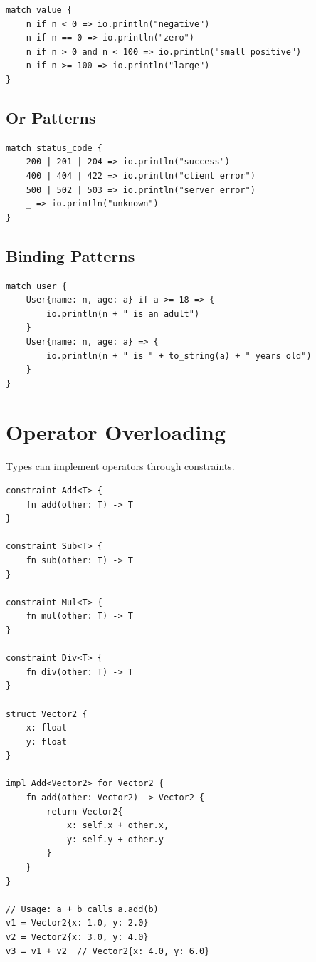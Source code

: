 \begin{lstlisting}
match value {
    n if n < 0 => io.println("negative")
    n if n == 0 => io.println("zero")
    n if n > 0 and n < 100 => io.println("small positive")
    n if n >= 100 => io.println("large")
}
\end{lstlisting}

\subsection{Or Patterns}

\begin{lstlisting}
match status_code {
    200 | 201 | 204 => io.println("success")
    400 | 404 | 422 => io.println("client error")
    500 | 502 | 503 => io.println("server error")
    _ => io.println("unknown")
}
\end{lstlisting}

\subsection{Binding Patterns}

\begin{lstlisting}
match user {
    User{name: n, age: a} if a >= 18 => {
        io.println(n + " is an adult")
    }
    User{name: n, age: a} => {
        io.println(n + " is " + to_string(a) + " years old")
    }
}
\end{lstlisting}

\section{Operator Overloading}

Types can implement operators through constraints.

\begin{lstlisting}
constraint Add<T> {
    fn add(other: T) -> T
}

constraint Sub<T> {
    fn sub(other: T) -> T
}

constraint Mul<T> {
    fn mul(other: T) -> T
}

constraint Div<T> {
    fn div(other: T) -> T
}

struct Vector2 {
    x: float
    y: float
}

impl Add<Vector2> for Vector2 {
    fn add(other: Vector2) -> Vector2 {
        return Vector2{
            x: self.x + other.x,
            y: self.y + other.y
        }
    }
}

// Usage: a + b calls a.add(b)
v1 = Vector2{x: 1.0, y: 2.0}
v2 = Vector2{x: 3.0, y: 4.0}
v3 = v1 + v2  // Vector2{x: 4.0, y: 6.0}
\end{lstlisting}

